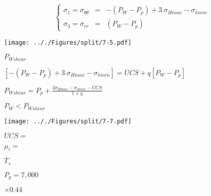 \documentclass[onecolumn,11pt]{report}
\def\lthtmlcheckvsize{\ifdim\ht\sizebox<\vsize 
  \ifdim\wd\sizebox<\hsize\expandafter\hfill\fi \expandafter\vfill
  \else\expandafter\vss\fi}%
\begin{document}
{\newpage\clearpage
{}%
\begin{displaymath}\left\lbrace
\begin{array}{rcl}
\sigma_1 = \sigma_{\theta \theta} & = &
-(P_W - P_p) +3 \: \sigma_{Hmax} -\sigma_{hmin} \\
\sigma_3 = \sigma_{rr} & = & (P_W - P_p)
\end{array}
\right.\end{displaymath}%
\lthtmldisplayZ
\lthtmlcheckvsize\clearpage}

{\newpage\clearpage
{}%
\texttt{[image: .././Figures/split/7-5.pdf]}%
\lthtmlpictureZ
\lthtmlcheckvsize\clearpage}

{\newpage\clearpage
{}%
$ P_{Wshear}$%
\lthtmlindisplaymathZ
\lthtmlcheckvsize\clearpage}

{\newpage\clearpage
{}%
$\displaystyle \left[
-(P_W - P_p) +3 \: \sigma_{Hmax} -\sigma_{hmin}
\right] = UCS + q \left[ P_W - P_p \right]$%
\lthtmlindisplaymathZ
\lthtmlcheckvsize\clearpage}

{\newpage\clearpage
{}%
$\displaystyle P_{Wshear} = P_p + \frac{3\sigma_{Hmax} -\sigma_{hmin}
- UCS}{1+q}$%
\lthtmlindisplaymathZ
\lthtmlcheckvsize\clearpage}

{\newpage\clearpage
{}%
$ P_W < P_{Wshear}$%
\lthtmlindisplaymathZ
\lthtmlcheckvsize\clearpage}

{\newpage\clearpage
{}%
\texttt{[image: .././Figures/split/7-7.pdf]}%
\lthtmlpictureZ
\lthtmlcheckvsize\clearpage}

{\newpage\clearpage
{}%
$ UCS =$%
\lthtmlindisplaymathZ
\lthtmlcheckvsize\clearpage}

{\newpage\clearpage
{}%
$ \mu_i=$%
\lthtmlindisplaymathZ
\lthtmlcheckvsize\clearpage}

{\newpage\clearpage
{}%
$ T_s$%
\lthtmlindisplaymathZ
\lthtmlcheckvsize\clearpage}

{\newpage\clearpage
{}%
$\displaystyle P_p = 7,000$%
\lthtmlindisplaymathZ
\lthtmlcheckvsize\clearpage}

{\newpage\clearpage
{}%
$\displaystyle \times 0.44$%
\lthtmlindisplaymathZ
\lthtmlcheckvsize\clearpage}
\end{document}
